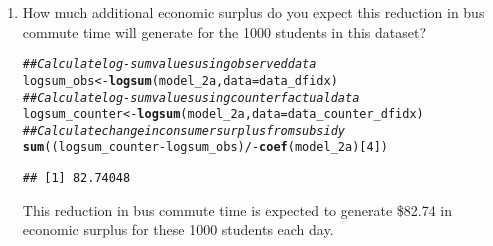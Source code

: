 \documentclass[11pt,letterpaper]{article}\usepackage[]{graphicx}\usepackage[]{xcolor}
\makeatletter
\newcommand{\hlnum}[1]{\textcolor[rgb]{0.686,0.059,0.569}{#1}}%
\newcommand{\hlcom}[1]{\textcolor[rgb]{0.678,0.584,0.686}{\textit{#1}}}%
\newcommand{\hlopt}[1]{\textcolor[rgb]{0,0,0}{#1}}%
\newcommand{\hlstd}[1]{\textcolor[rgb]{0.345,0.345,0.345}{#1}}%
\newcommand{\hlkwb}[1]{\textcolor[rgb]{0.69,0.353,0.396}{#1}}%
\newcommand{\hlkwc}[1]{\textcolor[rgb]{0.333,0.667,0.333}{#1}}%
\newcommand{\hlkwd}[1]{\textcolor[rgb]{0.737,0.353,0.396}{\textbf{#1}}}%
\newenvironment{kframe}{%
 \def\at@end@of@kframe{}%
 \ifinner\ifhmode%
  \def\at@end@of@kframe{\end{minipage}}%
  \begin{minipage}{\columnwidth}%
 \fi\fi%
 \def\FrameCommand##1{\hskip\@totalleftmargin \hskip-\fboxsep
 \colorbox{shadecolor}{##1}\hskip-\fboxsep
     \hskip-\linewidth \hskip-\@totalleftmargin \hskip\columnwidth}%
 \MakeFramed {\advance\hsize-\width
   \@totalleftmargin\z@ \linewidth\hsize
   \@setminipage}}%
 {\par\unskip\endMakeFramed%
 \at@end@of@kframe}
\newenvironment{knitrout}{}{} %
\makeatother
\begin{document}
\begin{enumerate}[label=\alph*., leftmargin=*]
\begin{enumerate}[label=\roman*.]
		\item How much additional economic surplus do you expect this reduction in bus commute time will generate for the 1000 students in this dataset?

\begin{knitrout}
\color{fgcolor}\begin{kframe}
\begin{alltt}
\hlcom{## Calculate log-sum values using observed data}
\hlstd{logsum_obs} \hlkwb{<-} \hlkwd{logsum}\hlstd{(model_2a,} \hlkwc{data} \hlstd{= data_dfidx)}
\hlcom{## Calculate log-sum values using counterfactual data}
\hlstd{logsum_counter} \hlkwb{<-} \hlkwd{logsum}\hlstd{(model_2a,} \hlkwc{data} \hlstd{= data_counter_dfidx)}
\hlcom{## Calculate change in consumer surplus from subsidy}
\hlkwd{sum}\hlstd{((logsum_counter} \hlopt{-} \hlstd{logsum_obs)} \hlopt{/ -}\hlkwd{coef}\hlstd{(model_2a)[}\hlnum{4}\hlstd{])}
\end{alltt}
\begin{verbatim}
## [1] 82.74048
\end{verbatim}
\end{kframe}
\end{knitrout}

		This reduction in bus commute time is expected to generate \$82.74 in economic surplus for these 1000 students each day.
	\end{enumerate}
\end{enumerate}
\end{document}
